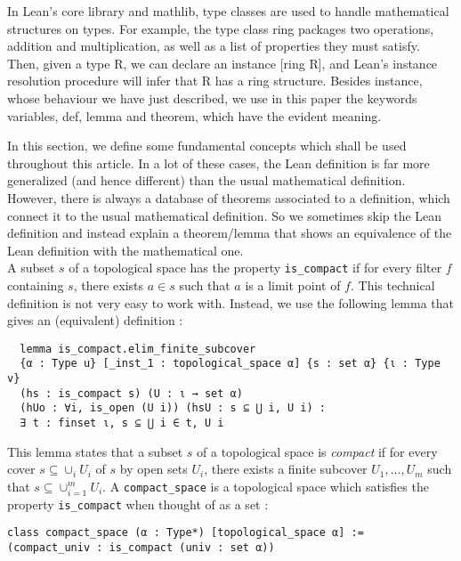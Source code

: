 \documentclass[a4paper,UKenglish,cleveref, autoref, thm-restate]{lipics-v2021}
\newcommand{\lean}[1]{\texttt{#1}\xspace} %
\begin{document}
In Lean’s core library and mathlib, type classes are used to handle mathematical
structures on types. For example, the type class ring packages two operations, addition and
multiplication, as well as a list of properties they must satisfy. Then, given a type R, we can
declare an instance [ring R], and Lean’s instance resolution procedure will infer that R has
a ring structure. Besides instance, whose behaviour we have just described, we use in this
paper the keywords variables, def, lemma and theorem, which have the evident meaning.

In this section, we define some fundamental concepts which shall be used throughout this article. In a lot of these cases, 
the Lean definition is far more generalized (and hence different) than the usual mathematical definition. However, there is 
always a database of theorems associated to a definition, which connect it to the usual mathematical definition. So 
we sometimes skip the Lean definition and instead explain a theorem/lemma that shows an equivalence of the Lean definition with the mathematical one. \\

A subset $s$ of a topological space has the property \lean{is\_compact} if for every filter $f$ containing 
$s$, there exists $a \in s$ such that $a$ is a limit point of $f$. This technical definition 
is not very easy to work with. Instead, we use the following lemma that gives an (equivalent) definition : 
\begin{lstlisting}
  lemma is_compact.elim_finite_subcover 
  {α : Type u} [_inst_1 : topological_space α] {s : set α} {ι : Type v} 
  (hs : is_compact s) (U : ι → set α) 
  (hUo : ∀i, is_open (U i)) (hsU : s ⊆ ⋃ i, U i) :
  ∃ t : finset ι, s ⊆ ⋃ i ∈ t, U i
\end{lstlisting}
This lemma states that a subset $s$ of a topological space is \textit{compact} if for every cover $s \subseteq \cup_{i} U_i$
of $s$ by open sets $U_i$, there exists a finite subcover $U_1, \dots, U_m$ such that
$s \subseteq \cup_{i = 1}^m U_i$. A \lean{compact\_space} is a topological space which satisfies the property 
\lean{is\_compact} when thought of as a set : 
\begin{lstlisting}
class compact_space (α : Type*) [topological_space α] :=
(compact_univ : is_compact (univ : set α))
\end{lstlisting}
\end{document}
